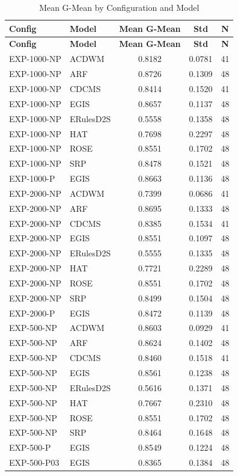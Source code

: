 \documentclass[lettersize,10pt]{article}
\begin{document}
\begin{longtable}{llccc}
\caption{Mean G-Mean by Configuration and Model}\label{tab:s_summary_config} \\
\toprule
\textbf{Config} & \textbf{Model} & \textbf{Mean G-Mean} & \textbf{Std} & \textbf{N} \\
\midrule
\endfirsthead
\toprule
\textbf{Config} & \textbf{Model} & \textbf{Mean G-Mean} & \textbf{Std} & \textbf{N} \\
\midrule
\endhead
EXP-1000-NP & ACDWM & 0.8182 & 0.0781 & 41 \\
EXP-1000-NP & ARF & 0.8726 & 0.1309 & 48 \\
EXP-1000-NP & CDCMS & 0.8414 & 0.1520 & 41 \\
EXP-1000-NP & EGIS & 0.8657 & 0.1137 & 48 \\
EXP-1000-NP & ERulesD2S & 0.5558 & 0.1358 & 48 \\
EXP-1000-NP & HAT & 0.7698 & 0.2297 & 48 \\
EXP-1000-NP & ROSE & 0.8551 & 0.1702 & 48 \\
EXP-1000-NP & SRP & 0.8478 & 0.1521 & 48 \\
EXP-1000-P & EGIS & 0.8663 & 0.1136 & 48 \\
EXP-2000-NP & ACDWM & 0.7399 & 0.0686 & 41 \\
EXP-2000-NP & ARF & 0.8695 & 0.1333 & 48 \\
EXP-2000-NP & CDCMS & 0.8385 & 0.1534 & 41 \\
EXP-2000-NP & EGIS & 0.8551 & 0.1097 & 48 \\
EXP-2000-NP & ERulesD2S & 0.5555 & 0.1335 & 48 \\
EXP-2000-NP & HAT & 0.7721 & 0.2289 & 48 \\
EXP-2000-NP & ROSE & 0.8551 & 0.1702 & 48 \\
EXP-2000-NP & SRP & 0.8499 & 0.1504 & 48 \\
EXP-2000-P & EGIS & 0.8472 & 0.1139 & 48 \\
EXP-500-NP & ACDWM & 0.8603 & 0.0929 & 41 \\
EXP-500-NP & ARF & 0.8624 & 0.1402 & 48 \\
EXP-500-NP & CDCMS & 0.8460 & 0.1518 & 41 \\
EXP-500-NP & EGIS & 0.8561 & 0.1238 & 48 \\
EXP-500-NP & ERulesD2S & 0.5616 & 0.1371 & 48 \\
EXP-500-NP & HAT & 0.7667 & 0.2310 & 48 \\
EXP-500-NP & ROSE & 0.8551 & 0.1702 & 48 \\
EXP-500-NP & SRP & 0.8464 & 0.1648 & 48 \\
EXP-500-P & EGIS & 0.8549 & 0.1224 & 48 \\
EXP-500-P03 & EGIS & 0.8365 & 0.1384 & 48 \\
\bottomrule
\end{longtable}
\end{document}
